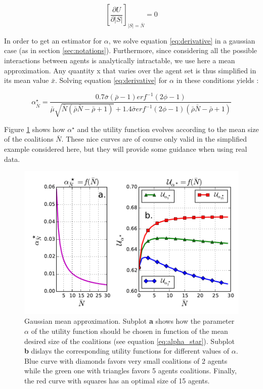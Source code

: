 \documentclass[conference]{IEEEtran}
\begin{document}
\begin{equation}
\left[ \dfrac{\partial{ U}}{ \partial{|S|}} \right]_{|S| = \bar{N}} = 0
\label{eq:derivative}
\end{equation}

In order to get an estimator for $ \alpha $, we solve equation \ref{eq:derivative} in a gaussian case (as in section \ref{sec:notations}). Furthermore, since considering all the possible interactions between agents is analytically intractable, we use here a mean approximation. Any quantity x that varies over the agent set is thus simplified in its mean value $ \bar{x} $. Solving equation \ref{eq:derivative} for $ \alpha $ in these conditions yields :

\footnotesize
\begin{equation}
\alpha^{\star}_{\bar{N}} = \dfrac{0.7 \bar{\sigma}(\bar{\rho}-1)erf^{-1}(2 \phi - 1)}{\bar{\mu}\sqrt{\bar{N}(\bar{\rho}\bar{N}-\bar{\rho}+1)}+1.4 \bar{\sigma} erf^{-1} (2 \phi -1 ) (\bar{\rho}\bar{N}-\bar{\rho} + 1)} 
\label{eq:alpha_star}
\end{equation}
\normalsize

Figure \ref{fig:mean_approx} shows how $ \alpha^{\star} $ and the utility function evolves according to the mean size of the coalitions $ \bar{N} $. These nice curves are of course only valid in the simplified example considered here, but they will provide some guidance when using real data.

\begin{figure}
\includegraphics[scale=.6]{mean_field.pdf}
\caption{Gaussian mean approximation. Subplot \textbf{a} shows how the parameter $ \alpha $ of the utility function should be chosen in function of the mean desired size of the coalitions (see equation \ref{eq:alpha_star}). Subplot \textbf{b} dislays the corresponding utility functions for different values of $ \alpha $. Blue curve with diamonds favors very small coalitions of 2 agents while the green one with triangles favors 5 agents coalitions. Finally, the red curve with squares has an optimal size of 15 agents. }
\label{fig:mean_approx}
\end{figure}
\end{document}
